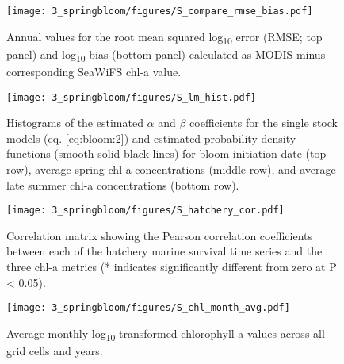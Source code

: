 \begin{figure}[htbp]
  \centering
  \texttt{[image: 3\_springbloom/figures/S\_compare\_rmse\_bias.pdf]}
  \caption{Annual values for the root mean squared log\textsubscript{10} error
   (RMSE; top panel) and log\textsubscript{10} bias (bottom panel) calculated
    as MODIS minus corresponding SeaWiFS chl-a value.}
  \label{fig:bloom:s2}
\end{figure}

\begin{figure}[htbp]
  \centering
  \texttt{[image: 3\_springbloom/figures/S\_lm\_hist.pdf]}
  \caption{Histograms of the estimated \(\alpha\) and \(\beta\) coefficients for
    the single stock models (eq. \ref{eq:bloom:2}) and estimated probability density functions
    (smooth solid black lines) for bloom initiation date (top row), average
    spring chl-a concentrations (middle row), and average late summer chl-a
    concentrations (bottom row).}
  \label{fig:bloom:s3}
\end{figure}

\begin{figure}[htbp]
  \centering
  \texttt{[image: 3\_springbloom/figures/S\_hatchery\_cor.pdf]}
  \caption{Correlation matrix showing the Pearson correlation coefficients
    between each of the hatchery marine survival time series and the three chl-a
    metrics (* indicates significantly different from zero at P \textless{}
    0.05).}
  \label{fig:bloom:s4}
\end{figure}

\begin{figure}[htbp]
  \centering
  \texttt{[image: 3\_springbloom/figures/S\_chl\_month\_avg.pdf]}
  \caption{Average monthly log\textsubscript{10} transformed chlorophyll-a
    values across all grid cells and years.}
  \label{fig:bloom:s5}
\end{figure}



